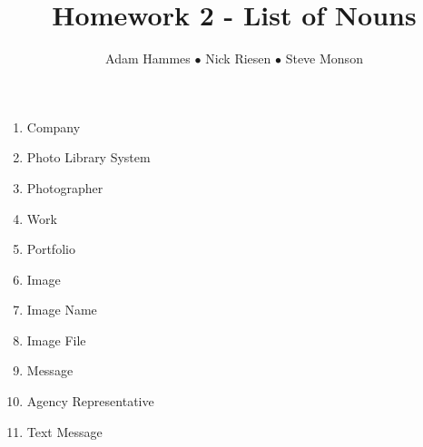 \documentclass{article}
\title{Homework 2 - List of Nouns}
\author{Adam Hammes $\bullet$ Nick Riesen $\bullet$ Steve Monson}
\begin{document}
\maketitle

\begin{enumerate}
    \item Company
    \item Photo Library System
    \item Photographer
    \item Work
    \item Portfolio
    \item Image
    \item Image Name
    \item Image File
    \item Message
    \item Agency Representative
    \item Text Message
\end{enumerate}
\end{document}
